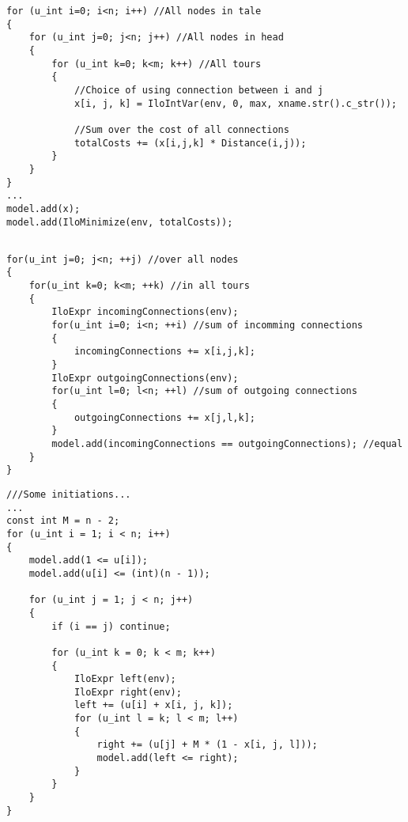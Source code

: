 \begin{appendices}


\begin{lstlisting}[caption=Objective function, label={app:app01}]
for (u_int i=0; i<n; i++) //All nodes in tale
{
    for (u_int j=0; j<n; j++) //All nodes in head
    {
    	for (u_int k=0; k<m; k++) //All tours
        {
            //Choice of using connection between i and j
            x[i, j, k] = IloIntVar(env, 0, max, xname.str().c_str());
            
            //Sum over the cost of all connections
            totalCosts += (x[i,j,k] * Distance(i,j));
        }
    }
}
...
model.add(x);
model.add(IloMinimize(env, totalCosts));
     
\end{lstlisting}





\begin{lstlisting}[caption=Sample of an implemented constraint,
label={app:app02}] for(u_int j=0; j<n; ++j) //over all nodes
{
    for(u_int k=0; k<m; ++k) //in all tours 
    {
        IloExpr incomingConnections(env);
        for(u_int i=0; i<n; ++i) //sum of incomming connections
        {
            incomingConnections += x[i,j,k];
        }
        IloExpr outgoingConnections(env);
        for(u_int l=0; l<n; ++l) //sum of outgoing connections
        {
            outgoingConnections += x[j,l,k];
        }
        model.add(incomingConnections == outgoingConnections); //equal
    }
}
\end{lstlisting}


\begin{lstlisting}[caption=Miller-Tucker-Zemlin,
label={app:app03}]
///Some initiations...
...
const int M = n - 2;
for (u_int i = 1; i < n; i++)
{
    model.add(1 <= u[i]);
    model.add(u[i] <= (int)(n - 1));

    for (u_int j = 1; j < n; j++)
    {
        if (i == j) continue;

        for (u_int k = 0; k < m; k++)
        {
            IloExpr left(env);
            IloExpr right(env);
            left += (u[i] + x[i, j, k]);
            for (u_int l = k; l < m; l++)
            {
                right += (u[j] + M * (1 - x[i, j, l]));
                model.add(left <= right);
            }
        }
    }
}
\end{lstlisting}

\end{appendices}